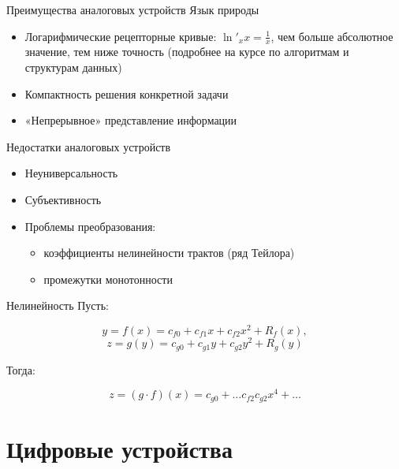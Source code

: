 \documentclass[xetex,aspectratio=43]{beamer}
\begin{document}
\begin{frame}{Преимущества аналоговых устройств}
	Язык природы

	\begin{itemize}

		\item
		Логарифмические рецепторные кривые: \(\ln'_{x}x = \frac{1}{x}\), чем
		больше абсолютное значение, тем ниже точность (подробнее на курсе по
		алгоритмам и структурам данных)
		\item
		Компактность решения конкретной задачи
		\item
		«Непрерывное» представление информации
	\end{itemize}

\end{frame}

\begin{frame}{Недостатки аналоговых устройств}
	\begin{itemize}

		\item
		Неуниверсальность
		\item
		Субъективность
		\item
		Проблемы преобразования:

		\begin{itemize}

			\item
			коэффициенты нелинейности трактов (ряд Тейлора)
			\item
			промежутки монотонности
		\end{itemize}
	\end{itemize}
\end{frame}

\begin{frame}{Нелинейность}
	Пусть:

	\[y = f(x) = c_{f0} + c_{f1} x + c_{f2} x^2 + R_f(x),\]
	\[z = g(y) = c_{g0} + c_{g1} y + c_{g2} y^2 + R_g(y)\]

	Тогда:

	\[ z = (g\cdot f)(x) = c_{g0} + \dots c_{f2} c_{g2} x^4 + \dots \]

	\begin{center}
		
	\end{center}
\end{frame}

\section{Цифровые устройства}
\end{document}
